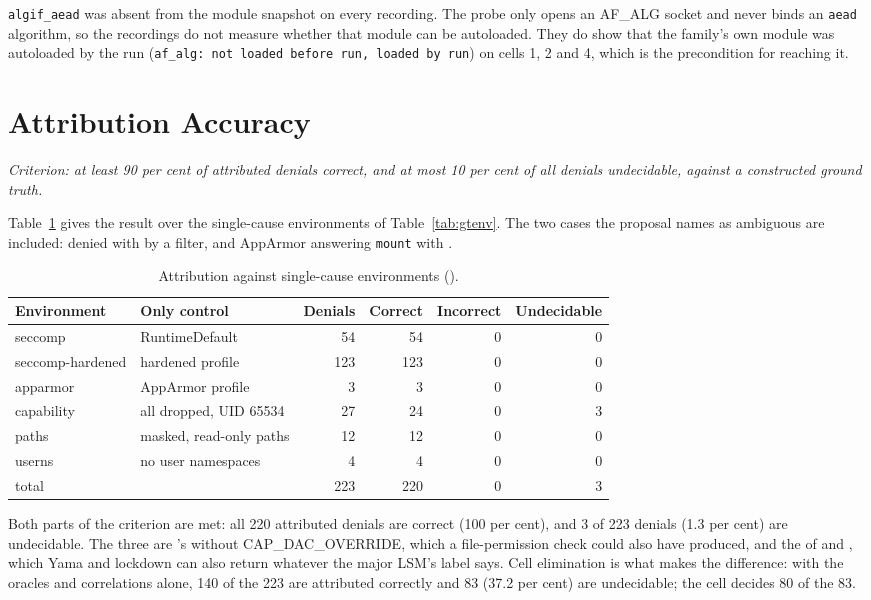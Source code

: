 \texttt{algif\_aead} was absent from the module snapshot on every recording. The probe only opens an AF\_ALG socket and never binds an \texttt{aead} algorithm, so the recordings do not measure whether that module can be autoloaded. They do show that the family's own module was autoloaded by the run (\texttt{af\_alg: not loaded before run, loaded by run}) on cells 1, 2 and 4, which is the precondition for reaching it.

\section{Attribution Accuracy}
\label{sec:res-attribution}

\emph{Criterion: at least 90 per cent of attributed denials correct, and at most 10 per cent of all denials undecidable, against a constructed ground truth.}

Table~\ref{tab:gt} gives the result over the single-cause environments of Table~\ref{tab:gtenv}. The two cases the proposal names as ambiguous are included:  denied with  by a filter, and AppArmor answering \texttt{mount} with .

\begin{table}[htbp]
\centering\small
\begin{tabular}{@{}llrrrr@{}}
\toprule
\textbf{Environment} & \textbf{Only control} & \textbf{Denials} & \textbf{Correct} & \textbf{Incorrect} & \textbf{Undecidable} \\
\midrule
seccomp & RuntimeDefault & 54 & 54 & 0 & 0 \\
seccomp-hardened & hardened profile & 123 & 123 & 0 & 0 \\
apparmor & AppArmor profile & 3 & 3 & 0 & 0 \\
capability & all dropped, UID 65534 & 27 & 24 & 0 & 3 \\
paths & masked, read-only paths & 12 & 12 & 0 & 0 \\
userns & no user namespaces & 4 & 4 & 0 & 0 \\
\midrule
total & & 223 & 220 & 0 & 3 \\
\bottomrule
\end{tabular}
\caption{Attribution against single-cause environments ().}
\label{tab:gt}
\end{table}

Both parts of the criterion are met: all 220 attributed denials are correct (100 per cent), and 3 of 223 denials (1.3 per cent) are undecidable. The three are 's  without CAP\_DAC\_OVERRIDE, which a file-permission check could also have produced, and the  of  and , which Yama and lockdown can also return whatever the major LSM's label says. Cell elimination is what makes the difference: with the oracles and correlations alone, 140 of the 223 are attributed correctly and 83 (37.2 per cent) are undecidable; the cell decides 80 of the 83.

